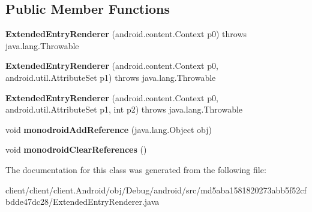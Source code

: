 \subsection*{Public Member Functions}
\begin{DoxyCompactItemize}
\item 
\hypertarget{classmd5aba1581820273abb5f52cfbdde47dc28_1_1ExtendedEntryRenderer_a1c78a7fc85a758ff7626dc9e82f5dc57}{}{\bfseries Extended\+Entry\+Renderer} (android.\+content.\+Context p0)  throws java.\+lang.\+Throwable 	\label{classmd5aba1581820273abb5f52cfbdde47dc28_1_1ExtendedEntryRenderer_a1c78a7fc85a758ff7626dc9e82f5dc57}

\item 
\hypertarget{classmd5aba1581820273abb5f52cfbdde47dc28_1_1ExtendedEntryRenderer_a7209fe5c4b93fe44f876b2c4dca53c95}{}{\bfseries Extended\+Entry\+Renderer} (android.\+content.\+Context p0, android.\+util.\+Attribute\+Set p1)  throws java.\+lang.\+Throwable 	\label{classmd5aba1581820273abb5f52cfbdde47dc28_1_1ExtendedEntryRenderer_a7209fe5c4b93fe44f876b2c4dca53c95}

\item 
\hypertarget{classmd5aba1581820273abb5f52cfbdde47dc28_1_1ExtendedEntryRenderer_a477c329adcac725a85622333f11ff130}{}{\bfseries Extended\+Entry\+Renderer} (android.\+content.\+Context p0, android.\+util.\+Attribute\+Set p1, int p2)  throws java.\+lang.\+Throwable 	\label{classmd5aba1581820273abb5f52cfbdde47dc28_1_1ExtendedEntryRenderer_a477c329adcac725a85622333f11ff130}

\item 
\hypertarget{classmd5aba1581820273abb5f52cfbdde47dc28_1_1ExtendedEntryRenderer_aca7039c7cbae57e1c3ac1e9990dac3b9}{}void {\bfseries monodroid\+Add\+Reference} (java.\+lang.\+Object obj)\label{classmd5aba1581820273abb5f52cfbdde47dc28_1_1ExtendedEntryRenderer_aca7039c7cbae57e1c3ac1e9990dac3b9}

\item 
\hypertarget{classmd5aba1581820273abb5f52cfbdde47dc28_1_1ExtendedEntryRenderer_aec98c5e7e8d9c47d34bc1cb32540bd71}{}void {\bfseries monodroid\+Clear\+References} ()\label{classmd5aba1581820273abb5f52cfbdde47dc28_1_1ExtendedEntryRenderer_aec98c5e7e8d9c47d34bc1cb32540bd71}

\end{DoxyCompactItemize}


The documentation for this class was generated from the following file\+:\begin{DoxyCompactItemize}
\item 
client/client/client.\+Android/obj/\+Debug/android/src/md5aba1581820273abb5f52cfbdde47dc28/Extended\+Entry\+Renderer.\+java\end{DoxyCompactItemize}
